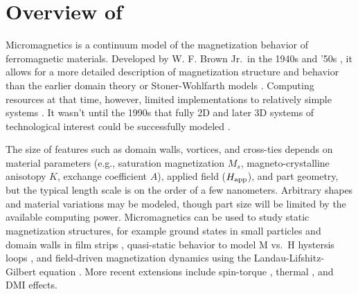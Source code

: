 \chapter{Overview of \OOMMF}\label{sec:overview}
Micromagnetics is a continuum model of the magnetization behavior of
ferromagnetic materials. Developed by W. F. Brown Jr.\ in the 1940s and
'50s \cite{brown1940,brown1963}, it allows for a more detailed description
of magnetization structure and behavior \cite{neel1955} than the earlier
domain theory \cite{weiss1906} or Stoner-Wohlfarth models
\cite{stoner1948}.  Computing resources at that time, however, limited
implementations to relatively simple systems \cite{labonte1969}. It
wasn't until the 1990s that fully 2D and later 3D systems of
technological interest could be successfully modeled
\cite{aharoni1996,fidler2000}.

The size of features such as domain walls, vortices, and cross-ties
depends on material parameters (e.g., saturation magnetization $M_s$,
magneto-crystalline anisotopy $K$, exchange coefficient $A$), applied
field ($H_{\rm app}$), and part geometry, but the typical length scale is on
the order of a few nanometers.  Arbitrary shapes and material variations
may be modeled, though part size will be limited by the available
computing power. Micromagnetics can be used to study static
magnetization structures, for example ground states in small particles
\cite{stdprob3mumag1998} and domain walls in film strips
\cite{mcmichael1997}, quasi-static behavior to model M vs.\ H hystersis
loops \cite{stdprob2mumag1998}, and field-driven magnetization dynamics
using the Landau-Lifshitz-Gilbert equation
\cite{gilbert1955,landau1935,stdprob4mumag2000}. More recent extensions
include spin-torque
\cite{stdprob5mumag2014,slonczewski1996,thiaville2005,xiao2004,zhang2004},
thermal \cite{garciapalacios1998}, and DMI \cite{thiaville2012} effects.

